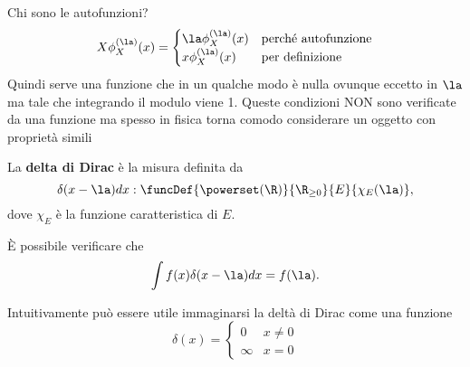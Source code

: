 \noindent Chi sono le autofunzioni?
\[X\phi_X^{(\la)}(x)=
\begin{cases}
\la \phi_X^{(\la)}(x) &\text{perch\'e autofunzione}\\
x\phi_X^{(\la)}(x) &\text{per definizione}
\end{cases}\]
Quindi serve una funzione che in un qualche modo \`e nulla ovunque eccetto in $\la$ ma tale che integrando il modulo viene 1. Queste condizioni NON sono verificate da una funzione ma spesso in fisica torna comodo considerare un oggetto con propriet\`a simili

\begin{definition}
La \textbf{delta di Dirac} \`e la misura definita da
\[\delta(x-\la)dx:\funcDef{\powerset(\R)}{\R_{\geq0}}{E}{\chi_E(\la)},\]
dove $\chi_E$ \`e la funzione caratteristica di $E$.
\end{definition}
\begin{remark}
\`E possibile verificare che
\[\int f(x)\delta(x-\la)dx=f(\la).\]
\end{remark}
\noindent Intuitivamente pu\`o essere utile immaginarsi la delt\`a di Dirac come una funzione
\[\delta(x)=\begin{cases}
0 &x\neq 0\\
\infty &x=0
\end{cases}\]

